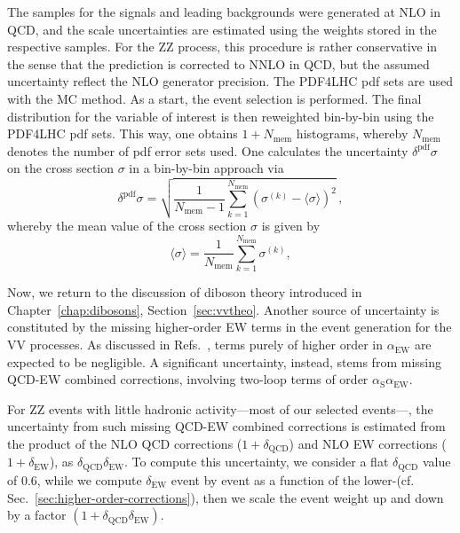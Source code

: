 The samples for the signals and leading backgrounds were generated at NLO in QCD,
and the scale uncertainties are estimated using the weights
stored in the respective samples. For the ZZ process, this procedure is rather conservative
in the sense that the prediction is corrected to NNLO in QCD, but the assumed uncertainty reflect
the NLO generator precision.
The PDF4LHC pdf sets are used with the MC method. As a start, the
event selection is performed. The final distribution for the variable
of interest is then reweighted bin-by-bin using the PDF4LHC pdf
sets. This way, one obtains $1+N_{\textrm{mem}}$ histograms, whereby
$N_{\textrm{mem}}$ denotes the number of pdf error sets used. One
calculates the uncertainty $\delta^{\textrm{pdf}}\sigma$ on the cross
section $\sigma$ in a bin-by-bin approach via 
\begin{equation}
\delta^{\textrm{pdf}} \sigma= \sqrt{ \frac{1}{N_{\textrm{mem}} - 1} \sum_{k=1}^{N_{\textrm{mem}}} \left(\sigma^{(k)} - \langle \sigma \rangle\right)^2 }\,,
\end{equation}
whereby the mean value of the cross section $\sigma$ is given by
\begin{equation}
\langle\sigma\rangle = \frac{1}{N_{\textrm{mem}}} \sum_{k=1}^{N_{\textrm{mem}}} \sigma^{(k)},
\end{equation}

Now, we return to the discussion of diboson theory introduced in Chapter~\ref{chap:dibosons}, Section~\ref{sec:vvtheo}.
Another source of uncertainty is constituted by the missing
higher-order EW terms in the event generation for the VV processes.
As discussed in Refs.~\cite{Bierweiler:2013dja,Gieseke:2014gka}, terms purely of higher
order in $\alpha_{\mathrm{EW}}$ are expected to be negligible.
A significant uncertainty, instead, stems from missing
QCD-EW combined corrections, \eg involving two-loop terms of order
$\alpha_{\mathrm{S}}\alpha_{\mathrm{EW}}$.

For ZZ events with little hadronic activity---\ie most of our selected events---, the
uncertainty from such missing QCD-EW combined corrections is
estimated from the product of the NLO QCD corrections 
($1+\delta_{\mathrm{QCD}}$) and NLO EW corrections
($1+\delta_{\mathrm{EW}}$), as
$\delta_{\mathrm{QCD}}\delta_{\mathrm{EW}}$. To compute this 
uncertainty, we consider a flat $\delta_{\mathrm{QCD}}$ value of
$0.6$, while we compute $\delta_{\mathrm{EW}}$ event by event as a
function of the lower-\Z \pt (cf. Sec.~\ref{sec:higher-order-corrections}), then we
scale the event weight up and down by a factor
$(1+\delta_{\mathrm{QCD}}\delta_{\mathrm{EW}})$.

